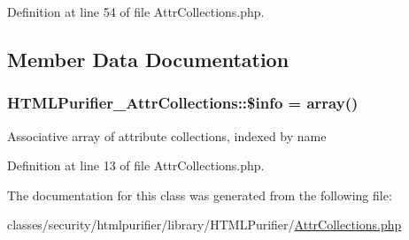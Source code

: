 Definition at line 54 of file Attr\+Collections.\+php.



\subsection{Member Data Documentation}
\hypertarget{classHTMLPurifier__AttrCollections_a588bcab5f5978c50456dbba61e695900}{
\subsubsection[{\$info}]{\setlength{\rightskip}{0pt plus 5cm}H\+T\+M\+L\+Purifier\+\_\+\+Attr\+Collections\+::\$info = array()}}\label{classHTMLPurifier__AttrCollections_a588bcab5f5978c50456dbba61e695900}
Associative array of attribute collections, indexed by name 

Definition at line 13 of file Attr\+Collections.\+php.



The documentation for this class was generated from the following file\+:\begin{DoxyCompactItemize}
\item 
classes/security/htmlpurifier/library/\+H\+T\+M\+L\+Purifier/\hyperlink{AttrCollections_8php}{Attr\+Collections.\+php}\end{DoxyCompactItemize}
